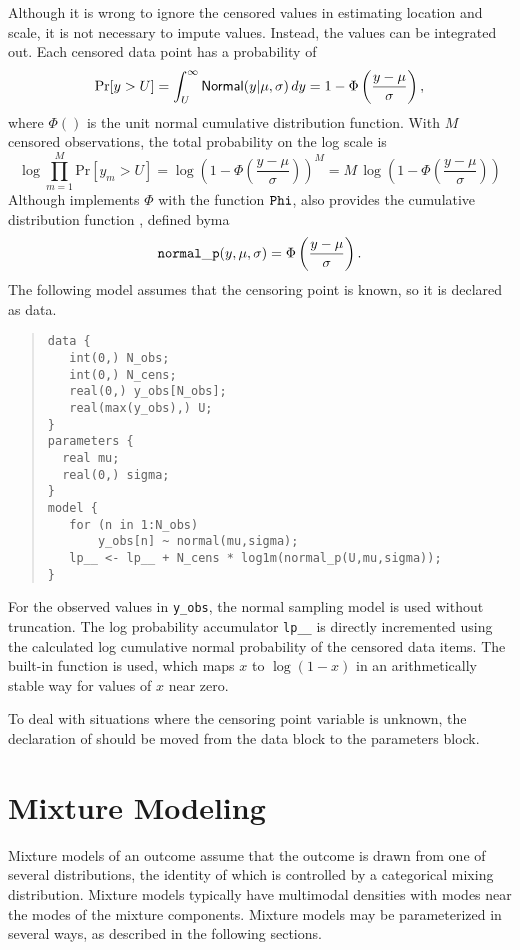 Although it is wrong to ignore the censored values in estimating
location and scale, it is not necessary to impute values.  Instead,
the values can be integrated out.  Each censored data point has a
probability of
%
\[
\mbox{Pr}[y > U] 
= \int_U^{\infty} \mbox{\sf Normal}(y|\mu,\sigma) \, dy
= 1 - \Phi\left(\frac{y - \mu}{\sigma}\right),
\]
%
where $\Phi()$ is the unit normal cumulative distribution function.
With $M$ censored observations, the total probability on the log scale
is
\[
\log \prod_{m=1}^M \mbox{Pr}[y_m > U]
= \log \left( 1 - \Phi\left(\frac{y - \mu}{\sigma}\right)\right)^{M}
= M \, \log \left( 1 - \Phi\left(\frac{y - \mu}{\sigma}\right)\right)
\]
% 
Although \Stan implements $\Phi$ with the function ${\tt Phi}$, \Stan
also provides the cumulative distribution function ,
defined byma
\[
{\tt normal\_p}(y,\mu,\sigma) = \Phi \left( \frac{y - \mu}{\sigma} \right).
\]
%
The following model assumes
that the censoring point is known, so it is declared as data.
%
\begin{quote}
\begin{Verbatim}
data {
   int(0,) N_obs;
   int(0,) N_cens;
   real(0,) y_obs[N_obs];
   real(max(y_obs),) U;
}
parameters {
  real mu;
  real(0,) sigma;
}
model {
   for (n in 1:N_obs)
       y_obs[n] ~ normal(mu,sigma); 
   lp__ <- lp__ + N_cens * log1m(normal_p(U,mu,sigma));
}
\end{Verbatim}
\end{quote}
%
For the observed values in \Verb|y_obs|, the normal sampling model is
used without truncation.  The log probability accumulator
\Verb|lp__| is directly incremented using the calculated log
cumulative normal probability of the censored data items.  The
built-in function  is used, which maps $x$ to $\log (1 -
x)$ in an arithmetically stable way for values of $x$ near zero.

To deal with situations where the censoring point variable  is
unknown, the declaration of  should be moved from the data
block to the parameters block.



\chapter{Mixture Modeling}\label{mixture-modeling.chapter}

\noindent
Mixture models of an outcome assume that the outcome is drawn from one
of several distributions, the identity of which is controlled by a
categorical mixing distribution. Mixture models typically have
multimodal densities with modes near the modes of the mixture
components.  Mixture models may be parameterized in several ways,
as described in the following sections.



